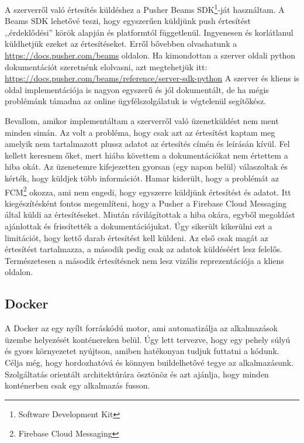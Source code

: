 \documentclass{thesis-ekf}
\theoremstyle{definition}
\theoremstyle{remark}
\begin{document}
A szerverről való értesítés küldéshez a Pusher Beams SDK\footnote{Software Development Kit}-ját használtam.
A Beams SDK lehetővé teszi, hogy egyszerűen küldjünk push értesítést ,,érdeklődési'' körök alapján és platformtól függetlenül.
Ingyenesen és korlátlanul küldhetjük ezeket az értesítéseket. Erről bővebben olvashatunk a \url{https://docs.pusher.com/beams} oldalon.
Ha kimondottan a szerver oldali python  dokumentációt szeretnénk elolvasni, azt megtehetjük itt: \url{https://docs.pusher.com/beams/reference/server-sdk-python}
A szerver és kliens is oldal implementációja is nagyon egyszerű és jól dokumentált, de ha mégis problémánk támadna az online ügyfélszolgálatuk is végtelenül segítőkész.

Bevallom, amikor implementáltam a szerverről való üzenetküldést nem ment minden simán.
Az volt a probléma, hogy csak azt az értesítést kaptam meg amelyik nem tartalmazott plussz adatot az értesítés címén és leírásán kívül.
Fel kellett keresnem őket, mert hiába követtem a dokumentációkat nem értettem a hiba okát.
Az üzenetemre kifejezetten gyorsan (egy napon belül) válaszoltak és kérték, hogy küldjek több információt.
Hamar kiderült, hogy a problémát az FCM\footnote{Firebase Cloud Messaging} okozza, ami nem engedi, hogy egyszerre küldjünk értesítést és adatot.
Itt kiegészítésként fontos megemlíteni, hogy a Pusher a Firebase Cloud Messaging által küldi az értesítéseket.
Miután rávilágítottak a hiba okára, egyből megoldást ajánlottak és frissítették a dokumentációjukat.
Úgy sikerült kikerülni ezt a limitációt, hogy kettő darab értesítést kell küldeni.
Az első csak magát az értesítést tartalmazza, a második pedig csak az adatok küldéséért lesz felelős.
Természetesen a második értesítésnek nem lesz vizális reprezentációja a kliens oldalon.


\subsection{Docker}\label{docker}

A Docker az egy nyílt forráskódú motor, ami automatizálja az alkalmazások üzembe helyezését konténereken belül.
Úgy lett tervezve, hogy egy pehely súlyú és gyors környezetet nyújtson, amiben hatékonyan tudjuk futtatni a kódunk.
Célja még, hogy hordozhatóvá és könnyen buildelhetővé tegye az alkalmazásunk.
Szolgáltatás orientált architektúrára ösztönöz és azt ajánlja, hogy minden konténerben csak egy alkalmazás fusson.\cite{docker}
\end{document}
